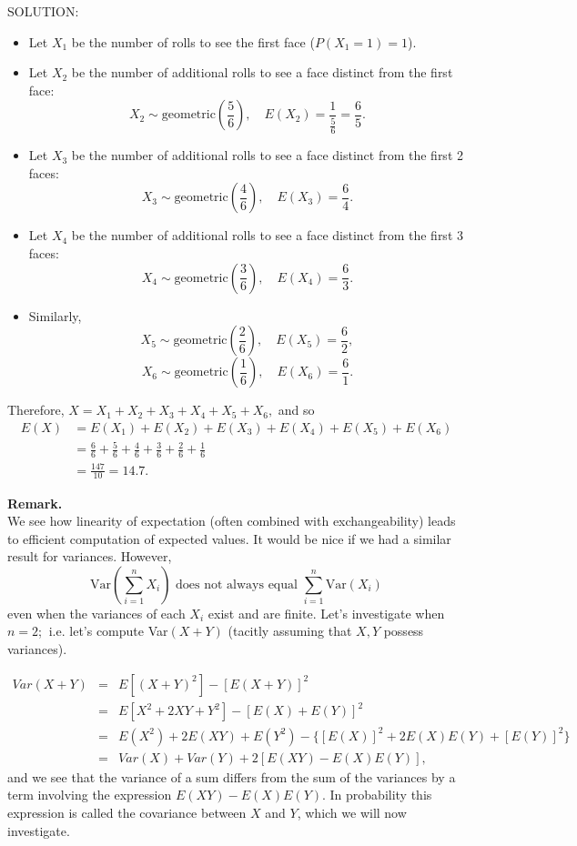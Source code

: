 \documentclass[12pt]{article}
\begin{document}
\noindent SOLUTION:
\begin{itemize}
    \item Let $X_1$ be the number of rolls to see the first face ($P(X_1 = 1) = 1$).
    \item Let $X_2$ be the number of additional rolls to see a face distinct from the first face:
    $$X_2 \sim \text{geometric}(\frac{5}{6}),\quad E(X_2) = \frac{1}{\frac{5}{6}} = \frac{6}{5}.$$
    \item Let $X_3$ be the number of additional rolls to see a face distinct from the first 2 faces:
    $$X_3 \sim \text{geometric}(\frac{4}{6}),\quad E(X_3) = \frac{6}{4}.$$
    \item Let $X_4$ be the number of additional rolls to see a face distinct from the first 3 faces:
    $$X_4 \sim \text{geometric}(\frac{3}{6}),\quad E(X_4) = \frac{6}{3}.$$
    \item Similarly,
    $$X_5 \sim \text{geometric}(\frac{2}{6}),\quad E(X_5) = \frac{6}{2},$$
    $$X_6 \sim \text{geometric}(\frac{1}{6}),\quad E(X_6) = \frac{6}{1}.$$
\end{itemize}
Therefore, $X = X_1 + X_2 + X_3+ X_4 + X_5 + X_6,$
and so
\begin{align*}
    E(X) &= E(X_1) + E(X_2) + E(X_3) + E(X_4) + E(X_5) + E(X_6) \\
    &= \frac{6}{6} + \frac{5}{6} + \frac{4}{6} + \frac{3}{6} + \frac{2}{6} + \frac{1}{6} \\
    &= \frac{147}{10} = 14.7.
\end{align*}

\vspace{0.75cm}

\noindent \textbf{Remark.} \\
We see how linearity of expectation (often combined with exchangeability) leads to efficient computation of expected values. It would be nice if we had a similar result for variances. However,
$$\text{Var}\left(\sum_{i=1}^n X_i \right) \text{ does not always equal }\sum_{i=1}^n \text{Var}(X_i)$$
even when the variances of each $X_i$ exist and are finite.
Let's investigate when $n = 2$; $~$i.e. let's compute Var$(X+Y)$ (tacitly assuming that $X, Y$ possess variances).\\

\newpage

\begin{eqnarray*}
    Var(X+Y) &=& E\left[(X+Y)^2\right] - \left[E(X+Y)\right]^2 \\
    &=& E\left[X^2 + 2XY + Y^2\right] - \left[E(X) + E(Y)\right]^2 \\
    &=& E(X^2) + 2E(XY) + E(Y^2) - \{[E(X)]^2 + 2E(X)E(Y) + [E(Y)]^2\} \\
    &=& Var(X) + Var(Y) + 2[E(XY) - E(X)E(Y)],
\end{eqnarray*}
and we see that the variance of a sum \label{varofsum}differs from the sum of the variances by a term involving the expression $E(XY)-E(X)E(Y)$. In probability this expression is called
the covariance between $X$ and $Y$, which we will now investigate.
\end{document}
